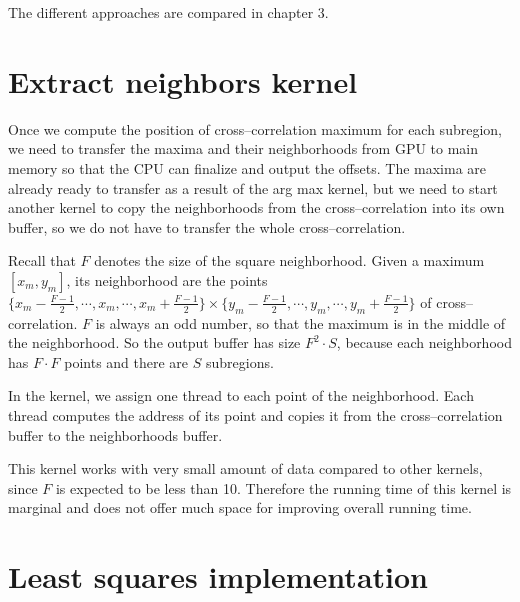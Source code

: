 The different approaches are compared in chapter 3.

\section{Extract neighbors kernel}

Once we compute the position of cross--correlation maximum for each subregion, we need to transfer the maxima and their neighborhoods from GPU to main memory so that the CPU can finalize and output the offsets. The maxima are already ready to transfer as a result of the arg max kernel, but we need to start another kernel to copy the neighborhoods from the cross--correlation into its own buffer, so we do not have to transfer the whole cross--correlation.

Recall that $F$ denotes the size of the square neighborhood. Given a maximum $[x_m, y_m]$, its neighborhood are the points $\{x_m - \frac{F-1}{2}, \cdots, x_m, \cdots, x_m + \frac{F-1}{2}\} \times \{y_m - \frac{F-1}{2}, \cdots, y_m, \cdots, y_m + \frac{F-1}{2}\}$ of cross--correlation. $F$ is always an odd number, so that the maximum is in the middle of the neighborhood. So the output buffer has size $F^2 \cdot S$, because each neighborhood has $F \cdot F$ points and there are $S$ subregions.

In the kernel, we assign one thread to each point of the neighborhood. Each thread computes the address of its point and copies it from the cross--correlation buffer to the neighborhoods buffer.

This kernel works with very small amount of data compared to other kernels, since $F$ is expected to be less than 10. Therefore the running time of this kernel is marginal and does not offer much space for improving overall running time.

\section{Least squares implementation}